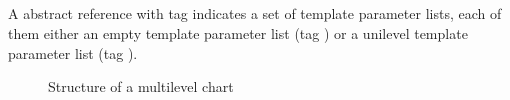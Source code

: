 

\subsection{}
\label{sec:ifc:ChartSort:Multilevel}

A  abstract reference with tag  indicates a set of template parameter lists, each of them either an empty template parameter list (tag ) or a unilevel template parameter list (tag ).

\begin{figure}[H]
	\centering
	\caption{Structure of a multilevel chart}
	\label{fig:ifc-multilevel-chart-structure}
\end{figure}

